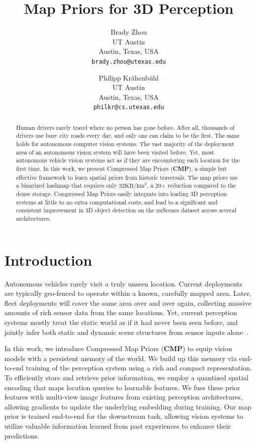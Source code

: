 \documentclass{article} %
\title{\name Map Priors for 3D Perception}
\author{Brady Zhou\\
UT Austin\\
Austin, Texas, USA\\
{\tt\small brady.zhou@utexas.edu}
\and
Philipp Kr{\"a}henb{\"u}hl\\
UT Austin\\
Austin, Texas, USA\\
{\tt\small philkr@cs.utexas.edu}
}
\newcommand{\name}{Compressed\xspace}
\newcommand{\ours}{CMP\xspace}
\newcommand{\oursbold}{\textbf{\ours}\xspace}
\begin{document}
\maketitle

\begin{abstract}
	Human drivers rarely travel where no person has gone before.
	After all, thousands of drivers use busy city roads every day, and only one can claim to be the first.
	The same holds for autonomous computer vision systems.
	The vast majority of the deployment area of an autonomous vision system will have been visited before.
	Yet, most autonomous vehicle vision systems act as if they are encountering each location for the first time.
	In this work, we present \name Map Priors (\oursbold), a simple but effective framework to learn spatial priors from historic traversals.
	The map priors use a binarized hashmap that requires only $32\text{KB}/\text{km}^2$, a 20$\times$ reduction compared to the dense storage.
	\name Map Priors easily integrate into leading 3D perception systems at little to no extra computational costs, and lead to a significant and consistent improvement in 3D object detection on the nuScenes dataset across several architectures.
\end{abstract}

\section{Introduction}
\label{sec:intro}

Autonomous vehicles rarely visit a truly unseen location.
Current deployments are typically geo-fenced to operate within a known, carefully mapped area.
Later, fleet deployments will cover the same area over and over again, collecting massive amounts of rich sensor data from the same locations.
Yet, current perception systems mostly treat the static world as if it had never been seen before, and jointly infer both static and dynamic scene structures from sensor inputs alone~\cite{liu2022bevfusion,peng2023bevsegformer,wang2023unitr,liu2022petrv2,huang2022bevpoolv2}.

In this work, we introduce \name Map Priors (\oursbold) to equip vision models with a persistent memory of the world.
We build up this memory via end-to-end training of the perception system using a rich and compact representation.
To efficiently store and retrieve prior information, we employ a quantized spatial encoding that maps location queries to learnable features.
We fuse these prior features with multi-view image features from existing perception architectures, allowing gradients to update the underlying embedding during training.
Our map prior is trained end-to-end for the downstream task, allowing vision systems to utilize valuable information learned from past experiences to enhance their predictions.
\end{document}
